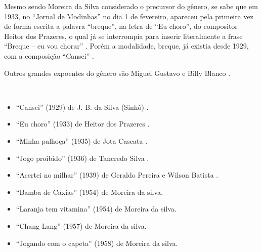 Mesmo sendo Moreira da Silva considerado o precursor do gênero, 
se sabe que em 1933, no ``Jornal de Modinhas'' no dia 1 de fevereiro, 
apareceu pela primeira vez de forma escrita a palavra ``breque'', na letra de ``Eu choro'', 
do compositor Heitor dos Prazeres, o qual já se interrompia para inserir literalmente 
a frase ``Breque -- eu vou chorar'' \cite[pp. 291]{dourado2004dicionario} \cite{rizzi2016musica}.
Porém a modalidade, breque, já existia desde 1929, com a composição ``Cansei'' \cite{rizzi2016musica}.

Outros grandes expoentes do gênero são Miguel Gustavo e Billy Blanco \cite[pp. 291]{dourado2004dicionario}.

\begin{example} ~

\begin{itemize}
\item ``Cansei'' (1929) de J. B. da Silva (Sinhô) \cite{rizzi2016musica} \cite{aguiar2013reis}.
\item ``Eu choro'' (1933) de Heitor dos Prazeres  \cite[pp. 291]{dourado2004dicionario}.
\item ``Minha palhoça'' (1935) de Jota Cascata \cite{aguiar2013reis}.
\item ``Jogo proibido'' (1936) de Tancredo Silva \cite{rizzi2016musica}.
\item ``Acertei no milhar'' (1939) de Geraldo Pereira e Wilson Batista \cite[pp. 129]{perna2002samba}.
\item ``Bamba de Caxias'' (1954) de Moreira da silva\cite{subgenerosdosamba2}.
\item ``Laranja tem vitamina'' (1954)  de Moreira da silva\cite{subgenerosdosamba2}.
\item ``Chang Lang'' (1957) de Moreira da silva\cite{subgenerosdosamba2}.
\item ``Jogando com o capeta'' (1958)  de Moreira da silva\cite{subgenerosdosamba2}.
\end{itemize}
\end{example}



